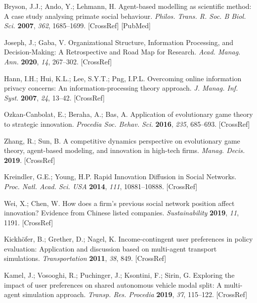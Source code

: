 \documentclass{article} %
\begin{document}
\begin{thebibliography}{9}
Bryson, J.J.; Ando, Y.; Lehmann, H. Agent-based modelling as scientific method: A case study analysing primate social behaviour. \textit{Philos. Trans. R. Soc. B Biol. Sci.} \textbf{2007}, \textit{362}, 1685–1699. [CrossRef] [PubMed]

Joseph, J.; Gaba, V. Organizational Structure, Information Processing, and Decision-Making: A Retrospective and Road Map for Research. \textit{Acad. Manag. Ann.} \textbf{2020}, \textit{14}, 267–302. [CrossRef]

Hann, I.H.; Hui, K.L.; Lee, S.Y.T.; Png, I.P.L. Overcoming online information privacy concerns: An information-processing theory approach. \textit{J. Manag. Inf. Syst.} \textbf{2007}, \textit{24}, 13–42. [CrossRef]

Ozkan-Canbolat, E.; Beraha, A.; Bas, A. Application of evolutionary game theory to strategic innovation. \textit{Procedia Soc. Behav. Sci.} \textbf{2016}, \textit{235}, 685–693. [CrossRef]

Zhang, R.; Sun, B. A competitive dynamics perspective on evolutionary game theory, agent-based modeling, and innovation in high-tech firms. \textit{Manag. Decis.} \textbf{2019}. [CrossRef]

Kreindler, G.E.; Young, H.P. Rapid Innovation Diffusion in Social Networks. \textit{Proc. Natl. Acad. Sci. USA} \textbf{2014}, \textit{111}, 10881–10888. [CrossRef]

Wei, X.; Chen, W. How does a firm’s previous social network position affect innovation? Evidence from Chinese listed companies. \textit{Sustainability} \textbf{2019}, \textit{11}, 1191. [CrossRef]

Kickhöfer, B.; Grether, D.; Nagel, K. Income-contingent user preferences in policy evaluation: Application and discussion based on multi-agent transport simulations. \textit{Transportation} \textbf{2011}, \textit{38}, 849. [CrossRef]

Kamel, J.; Vosooghi, R.; Puchinger, J.; Ksontini, F.; Sirin, G. Exploring the impact of user preferences on shared autonomous vehicle modal split: A multi-agent simulation approach. \textit{Transp. Res. Procedia} \textbf{2019}, \textit{37}, 115–122. [CrossRef]

\end{thebibliography}
\end{document}
